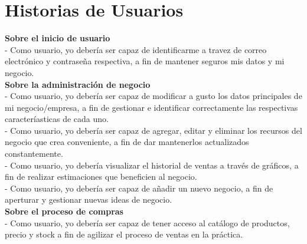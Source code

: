 \chapter{Historias de Usuarios}
\setlength{\parindent}{0pt}
\textbf{Sobre el inicio de usuario}\\
- Como usuario, yo debería ser capaz de identificarme a travez de correo electrónico y contraseña respectiva, a fin de mantener seguros mis datos y mi negocio.\\
\textbf{Sobre la administración de negocio}\\
- Como usuario, yo debería ser capaz de modificar a gusto los datos principales de mi negocio/empresa, a fin de gestionar e identificar correctamente las respectivas caracteríasticas de cada uno.\\
- Como usuario, yo debería ser capaz de agregar, editar y eliminar los recursos del negocio que crea conveniente, a fin de dar mantenerlos actualizados constantemente.\\
- Como usuario, yo debería visualizar el historial de ventas a través de gráficos, a fin de realizar estimaciones que beneficien al negocio.\\
- Como usuario, yo debería ser capaz de añadir un nuevo negocio, a fin de aperturar y gestionar nuevas ideas de negocio.\\
\textbf{Sobre el proceso de compras}\\
- Como usuario, yo debería ser capaz de tener acceso al catálogo de productos, precio y stock a fin de agilizar el proceso de ventas en la práctica. 